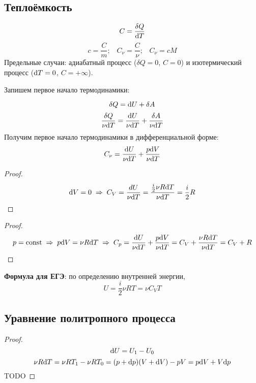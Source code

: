 \subsection{Теплоёмкость}
\[C=\frac{\delta Q}{\text{d} T}\]
\[c = \frac{C}{m} \text{;} \quad
C_\nu = \frac{C}{\nu} \text{;} \quad
C_\nu = cM\]
Предельные случаи: адиабатный процесс ($\delta Q = 0$, $C = 0$) и изотермический процесс ($\text{d} T = 0$, $C = +\infty$).\par


Запишем первое начало термодинамики:\par
\[\delta Q = \text{d} U + \delta A\]
\[\frac{\delta Q}{\nu \text{d} T} = \frac{\text{d} U}{\nu \text{d} T} + \frac{\delta A}{\nu \text{d} T}\]
Получим первое начало термодинамики в дифференциальной форме:
\[C_\nu=\frac{\text{d} U}{\nu \text{d} T} + \frac{p \text{d} V}{\nu \text{d} T}\]

\begin{proof}
	\[\text{d} V = 0 \;\Rightarrow\; C_V = \frac{dU}{\nu \text{d} T} = \frac{\frac{i}{2}\nu R \text{d} T}{\nu \text{d} T} = \frac{i}{2}R \]
\end{proof}

\begin{proof}
	\[p =\text{const} \;\Rightarrow\; p\text{d} V = \nu R \text{d} T \;\Rightarrow\; C_p = \frac{\text{d} U}{\nu \text{d} T} + \frac{p \text{d} V}{\nu \text{d} T} = C_V + \frac{\nu R \text{d} T}{\nu \text{d} T} = C_V + R\]
\end{proof}

\textbf{Формула для ЕГЭ}: по определению внутренней энергии,
\[U = \frac{i}{2} \nu R T = \nu C_V T\]



\subsection{Уравнение политропного процесса}
\begin{proof}
	\[ \text{d} U = U_1 - U_0 \]
	\[ \nu R \text{d} T = \nu R T_1 - \nu R T_0 = (p + \text{d} p)(V + \text{d} V) - pV = p \text{d} V + V \text{d} p \]
	TODO\par
\end{proof}

